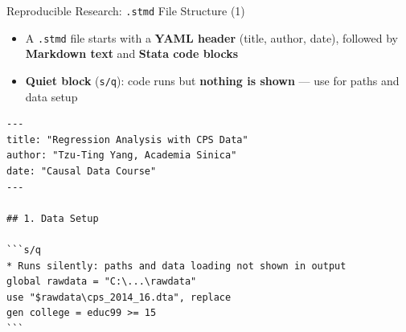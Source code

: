 \documentclass[dvipsnames,hyperref={pdfpagelabels=false}]{beamer}
\begin{document}
\begin{frame}[fragile]{Reproducible Research: \texttt{.stmd} File Structure (1)}

	\begin{itemize}
		\item A \texttt{.stmd} file starts with a \textbf{YAML header} (title, author, date), followed by \textbf{Markdown text} and \textbf{Stata code blocks}
		\vspace{0.2cm}
		\item \textbf{Quiet block} (\texttt{{\char96}{}{}s/q}): code runs but \textbf{nothing is shown} --- use for paths and data setup
	\end{itemize}

\begin{lstlisting}[language={},basicstyle=\ttfamily\fontsize{8}{10}\selectfont,keywordstyle={}]
---
title: "Regression Analysis with CPS Data"
author: "Tzu-Ting Yang, Academia Sinica"
date: "Causal Data Course"
---

## 1. Data Setup

```s/q
* Runs silently: paths and data loading not shown in output
global rawdata = "C:\...\rawdata"
use "$rawdata\cps_2014_16.dta", replace
gen college = educ99 >= 15
```
\end{lstlisting}

\end{frame}
\end{document}
